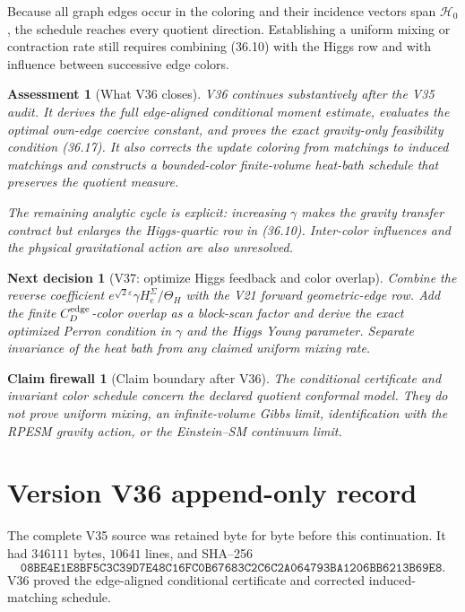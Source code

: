 \documentclass[11pt]{article}
\newtheorem{firewall}[theorem]{Claim firewall}
\newtheorem{decision}[theorem]{Next decision}
\newtheorem{assessment}[theorem]{Assessment}
\theoremstyle{remark}
\begin{document}
Because all graph edges occur in the coloring and their incidence
vectors span \(\mathcal H_0\), the schedule reaches every quotient
direction.  Establishing a uniform mixing or contraction rate still
requires combining (36.10) with the Higgs row and with influence between
successive edge colors.

\begin{assessment}[What V36 closes]
\label{ass:v17v36-status}
V36 continues substantively after the V35 audit.  It derives the full
edge-aligned conditional moment estimate, evaluates the optimal
own-edge coercive constant, and proves the exact gravity-only
feasibility condition (36.17).  It also corrects the update coloring
from matchings to induced matchings and constructs a bounded-color
finite-volume heat-bath schedule that preserves the quotient measure.

The remaining analytic cycle is explicit: increasing \(\gamma\) makes
the gravity transfer contract but enlarges the Higgs-quartic row in
(36.10).  Inter-color influences and the physical gravitational action
are also unresolved.
\end{assessment}

\begin{decision}[V37: optimize Higgs feedback and color overlap]
\label{dec:v17v36-next}
Combine the reverse coefficient
\(e^{\sqrt2\varepsilon}\gamma H_e^{\Sigma}/\Theta_H\)
with the V21 forward geometric-edge row.  Add the finite
\(C_D^{\rm edge}\)-color overlap as a block-scan factor and derive the
exact optimized Perron condition in \(\gamma\) and the Higgs Young
parameter.  Separate invariance of the heat bath from any claimed
uniform mixing rate.
\end{decision}

\begin{firewall}[Claim boundary after V36]
\label{fire:v17v36}
The conditional certificate and invariant color schedule concern the
declared quotient conformal model.  They do not prove uniform mixing,
an infinite-volume Gibbs limit, identification with the RPESM gravity
action, or the Einstein--SM continuum limit.
\end{firewall}

\section*{Version V36 append-only record}
The complete V35 source was retained byte for byte before this
continuation.  It had \(346111\) bytes, \(10641\) lines, and SHA--256
\[
 \texttt{08BE4E1E8BF5C3C39D7E48C16FC0B67683C2C6C2A064793BA1206BB6213B69E8}.
\]
V36 proved the edge-aligned conditional certificate and corrected
induced-matching schedule.
\end{document}
